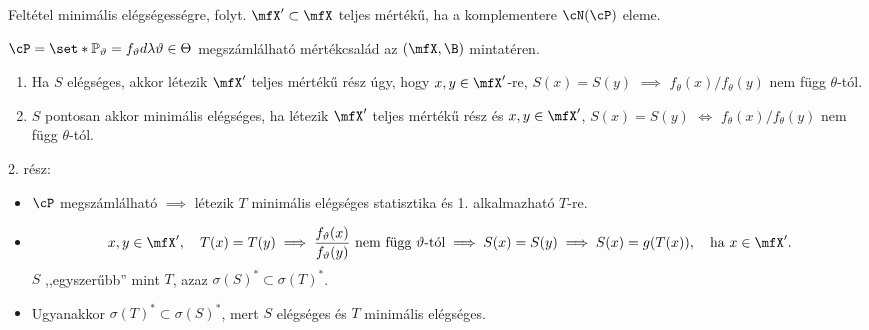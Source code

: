 \documentclass[aspectratio=169,notheorems,9pt,\option]{beamer}
\begin{document}
\begin{frame}{Feltétel minimális elégségességre, folyt.}
  $\mfX'\subset\mfX$ teljes mértékű, ha a komplementere $\cN(\cP)$ eleme.
  \begin{theorem} $\cP=\set*{\P[\theta]=f_\theta d\lambda}{\theta\in\Theta}$ megszámlálható
     mértékcsalád az $(\mfX,\B)$ mintatéren.
    \begin{enumerate}[<*>]
      \item Ha $S$ elégséges, akkor létezik $\mfX'$ teljes mértékű rész úgy, hogy $x,y\in\mfX'$-re, $S(x)=S(y)$ $\implies$  
      $f_\theta(x)/f_\theta(y)$ nem függ $\theta$-tól.
      \item $S$ pontosan akkor minimális elégséges, ha létezik $\mfX'$ teljes mértékű rész és $x,y\in\mfX'$, 
      $S(x)=S(y)$ $\iff$  $f_\theta(x)/f_\theta(y)$ nem függ $\theta$-tól.
    \end{enumerate}
  \end{theorem}
  2. rész:
  \begin{itemize}
    \item %
    $\cP$ megszámlálható $\implies$ 
    létezik $T$ minimális elégséges statisztika és 1. alkalmazható $T$-re.
    
    \item %
    \begin{displaymath}
      x,y\in\mfX',\quad T(x)=T(y)
      \implies %
      \text{$\frac{f_\theta(x)}{f_\theta(y)}$ nem függ $\theta$-tól}
      \implies
      S(x)=S(y)
      \implies
      S(x)=g(T(x)),\quad\text{ha $x\in\mfX'$}.
    \end{displaymath}
    $S$ ,,egyszerűbb'' mint $T$, azaz $\sigma(S)^*\subset\sigma(T)^*$.
    \item Ugyanakkor $\sigma(T)^*\subset\sigma(S)^*$, mert $S$ 
    elégséges és $T$ minimális elégséges.
  \end{itemize}
\end{frame}
\end{document}
